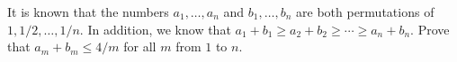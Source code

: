 It is known that the numbers $a_1, \ldots, a_n$ and $b_1, \ldots, b_n$ are both permutations of $1, 1/2, \ldots, 1/n$. In addition, we know that $a_1 + b_1 \geq a_2 + b_2 \geq \cdots \geq a_n + b_n$. Prove that $a_m + b_m \leq 4/m$ for all $m$ from $1$ to $n$.
